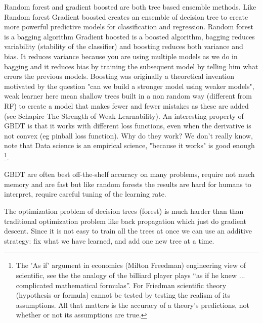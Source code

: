 \documentclass[11pt]{article}
\theoremstyle{definition}
\theoremstyle{remark}
\begin{document}
{Random forest and gradient boosted are both tree based ensemble methods. Like Random forest Gradient boosted creates an ensemble of decision tree to create more powerful predictive models for classification and regression. Random forest is a bagging algorithm Gradient boosted is a boosted algorithm, bagging reduces variability (stability of the classifier) and boosting reduces both variance and bias. It reduces variance because you are using multiple models as we do in bagging and it reduces bias by training the subsequent model by telling him what errors the previous models.
Boosting was originally a theoretical invention motivated by the question "can we build a stronger model using weaker models", weak learner here mean shallow trees built in a non random way (different from RF) to create a model that makes fewer and fewer mistakes as these are added (see Schapire The Strength of Weak Learnability). An interesting property of GBDT is that it works with different loss functions, even when the derivative is not convex (eg pinball loss function). %
Why do they work? We don't really know, note that Data science is an empirical science, "because it works" is good enough \footnote{The 'As if' argument in economics (Milton Freedman) engineering view of scientific, see the the analogy of the billiard player plays “as if he knew ... complicated mathematical formulas”. For Friedman scientific theory (hypothesis or formula) cannot be tested by testing the realism of its assumptions.  All that matters is the accuracy of a theory’s predictions, not whether or not its assumptions are true. }. %

GBDT are often best off-the-shelf accuracy on many problems, require not much memory and are fast but like random forests the results are hard for humans to interpret, require careful tuning of the learning rate.

The optimization problem of decision trees (forest) is much harder than than traditional optimization problem like back propagation which just do gradient descent. Since it is not easy to train all the trees at once we can use an additive strategy: fix what we have learned, and add one new tree at a time. 

}
\end{document}
